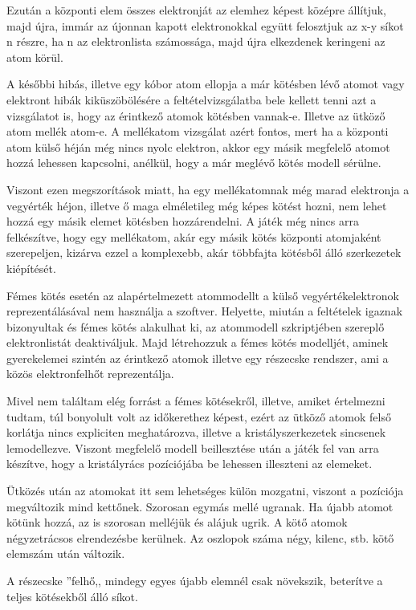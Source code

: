 \documentclass[colorlinks]{thesis-ekf}
\theoremstyle{definition}
\theoremstyle{remark}
\begin{document}
Ezután a központi elem összes elektronját az elemhez képest középre állítjuk, majd újra, immár az újonnan kapott elektronokkal együtt felosztjuk az x-y síkot n részre, ha n az elektronlista számossága, majd újra elkezdenek keringeni az atom körül.

A későbbi hibás, illetve egy kóbor atom ellopja a már kötésben lévő atomot vagy elektront hibák kiküszöbölésére a feltételvizsgálatba bele kellett tenni azt a vizsgálatot is, hogy az érintkező atomok kötésben vannak-e. Illetve az ütköző atom mellék atom-e. A mellékatom vizsgálat azért fontos, mert ha a központi atom külső héján még nincs nyolc elektron, akkor egy másik megfelelő atomot hozzá lehessen kapcsolni, anélkül, hogy a már meglévő kötés modell sérülne.

Viszont ezen megszorítások miatt, ha egy mellékatomnak még marad elektronja a vegyérték héjon, illetve ő maga elméletileg még képes kötést hozni, nem lehet hozzá egy másik elemet kötésben hozzárendelni. A játék még nincs arra felkészítve, hogy egy mellékatom, akár egy másik kötés központi atomjaként szerepeljen, kizárva ezzel a komplexebb, akár többfajta kötésből álló szerkezetek kiépítését.

Fémes kötés esetén az alapértelmezett atommodellt a külső vegyértékelektronok reprezentálásával nem használja a szoftver. Helyette, miután a feltételek igaznak bizonyultak és fémes kötés alakulhat ki, az atommodell szkriptjében szereplő elektronlistát deaktiváljuk. Majd létrehozzuk a fémes kötés modelljét, aminek gyerekelemei szintén az érintkező atomok illetve egy részecske rendszer, ami a közös elektronfelhőt reprezentálja.

Mivel nem találtam elég forrást a fémes kötésekről, illetve, amiket értelmezni tudtam, túl bonyolult volt az időkerethez képest, ezért az ütköző atomok felső korlátja nincs expliciten meghatározva, illetve a kristályszerkezetek sincsenek lemodellezve. Viszont megfelelő modell beillesztése után a játék fel van arra készítve, hogy a kristályrács pozíciójába be lehessen illeszteni az elemeket.

Ütközés után az atomokat itt sem lehetséges külön mozgatni, viszont a pozíciója megváltozik mind kettőnek. Szorosan egymás mellé ugranak. Ha újabb atomot kötünk hozzá, az is szorosan melléjük és alájuk ugrik. A kötő atomok négyzetrácsos elrendezésbe kerülnek. Az oszlopok száma négy, kilenc, stb. kötő elemszám után változik.

A részecske ''felhő,, mindegy egyes újabb elemnél csak növekszik, beterítve a teljes kötésekből álló síkot.
\end{document}

